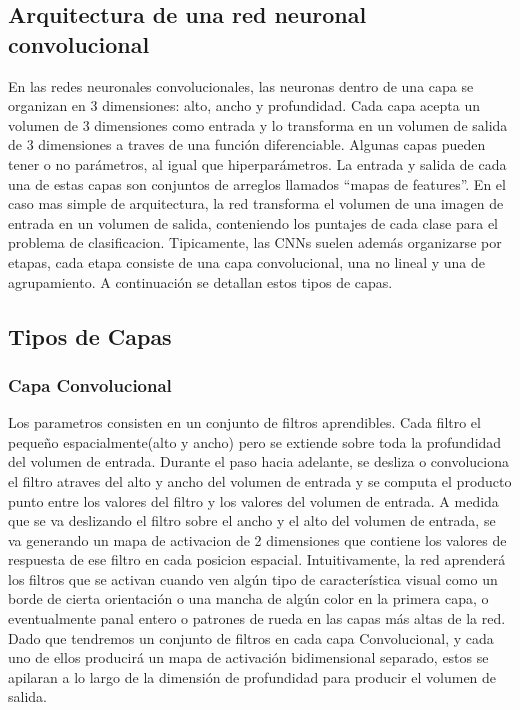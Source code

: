 \documentclass[a4paper,11pt,spanish]{book}
\begin{document}
    \subsection {Arquitectura de una red neuronal convolucional}
      En las redes neuronales convolucionales, las neuronas dentro de una capa se organizan en 3 dimensiones: alto, ancho y profundidad.
      Cada capa acepta un volumen de 3 dimensiones como entrada y lo transforma en un volumen de salida de 3 dimensiones a traves de una función diferenciable.
      Algunas capas pueden tener o no parámetros, al igual que hiperparámetros. La entrada y salida de cada una de estas capas son conjuntos de arreglos llamados “mapas de features”.
      En el caso mas simple de arquitectura, la red transforma el volumen de una imagen de entrada en un volumen de salida, conteniendo los puntajes de cada clase para el problema de clasificacion.
      Tipicamente, las CNNs suelen además organizarse por etapas, cada etapa consiste de una capa convolucional, una no lineal y una de agrupamiento. 
      A continuación se detallan estos tipos de capas.

    \subsection {Tipos de Capas}
      \subsubsection{Capa Convolucional} 
	Los parametros consisten en un conjunto de filtros aprendibles. Cada filtro el pequeño espacialmente(alto y ancho) pero se extiende sobre toda la profundidad del volumen de entrada.
	Durante el paso hacia adelante, se desliza o convoluciona el filtro atraves del alto y ancho del volumen de entrada y se computa el producto punto entre los valores del filtro y los valores
	del volumen de entrada. A medida que se va deslizando el filtro sobre el ancho y el alto del volumen de entrada, se va generando un mapa de activacion de 2 dimensiones que contiene los 
	valores de respuesta de ese filtro en cada posicion espacial.
	Intuitivamente, la red aprenderá los filtros que se activan cuando ven algún tipo de característica visual como un borde de cierta orientación o una mancha de algún color en la 
	primera capa, o eventualmente panal entero o patrones de rueda en las capas más altas de la red. Dado que tendremos un conjunto de filtros en cada capa Convolucional, 
	y cada uno de ellos producirá un mapa de activación bidimensional separado, estos se apilaran a lo largo de la dimensión de profundidad para producir el volumen de salida.
\end{document}

